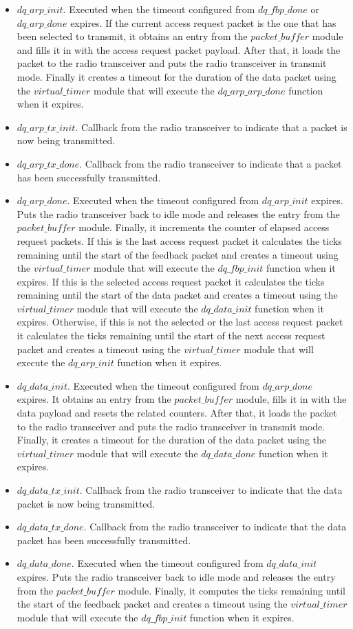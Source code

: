 \begin{itemize}
\item $dq\_arp\_init$. Executed when the timeout configured from $dq\_fbp\_done$ or $dq\_arp\_done$ expires. If the current access request packet is the one that has been selected to transmit, it obtains an entry from the $packet\_buffer$ module and fills it in with the access request packet payload. After that, it loads the packet to the radio transceiver and puts the radio transceiver in transmit mode. Finally it creates a timeout for the duration of the data packet using the $virtual\_timer$ module that will execute the $dq\_arp\_arp\_done$ function when it expires.
\item $dq\_arp\_tx\_init$. Callback from the radio transceiver to indicate that a packet is now being transmitted.
\item $dq\_arp\_tx\_done$. Callback from the radio transceiver to indicate that a packet has been successfully transmitted.
\item $dq\_arp\_done$. Executed when the timeout configured from $dq\_arp\_init$ expires. Puts the radio transceiver back to idle mode and releases the entry from the $packet\_buffer$ module. Finally, it increments the counter of elapsed access request packets. If this is the last access request packet it calculates the ticks remaining until the start of the feedback packet and creates a timeout using the $virtual\_timer$ module that will execute the $dq\_fbp\_init$ function when it expires. If this is the selected access request packet it calculates the ticks remaining until the start of the data packet and creates a timeout using the $virtual\_timer$ module that will execute the $dq\_data\_init$ function when it expires. Otherwise, if this is not the selected or the last access request packet it calculates the ticks remaining until the start of the next access request packet and creates a timeout using the $virtual\_timer$ module that will execute the $dq\_arp\_init$ function when it expires.

\item $dq\_data\_init$. Executed when the timeout configured from $dq\_arp\_done$ expires. It obtains an entry from the $packet\_buffer$ module,  fills it in with the data payload and resets the related counters. After that, it loads the packet to the radio transceiver and puts the radio transceiver in transmit mode. Finally, it creates a timeout for the duration of the data packet using the $virtual\_timer$ module that will execute the $dq\_data\_done$ function when it expires.
\item $dq\_data\_tx\_init$. Callback from the radio transceiver to indicate that the data packet is now being transmitted.
\item $dq\_data\_tx\_done$. Callback from the radio transceiver to indicate that the data packet has been successfully transmitted.
\item $dq\_data\_done$. Executed when the timeout configured from $dq\_data\_init$ expires. Puts the radio transceiver back to idle mode and releases the entry from the $packet\_buffer$ module. Finally, it computes the ticks remaining until the start of the feedback packet and creates a timeout using the $virtual\_timer$ module that will execute the $dq\_fbp\_init$ function when it expires.


\end{itemize}

